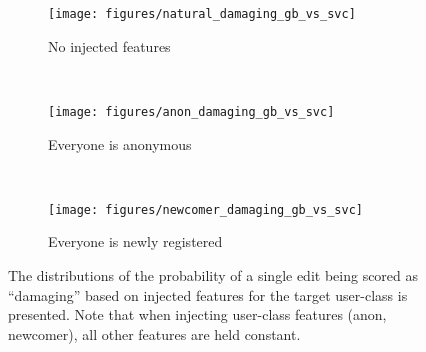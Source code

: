 \begin{figure*}[h!]
\centering
\begin{subfigure}[t]{.33\textwidth}
  \centering
  \texttt{[image: figures/natural\_damaging\_gb\_vs\_svc]}
  \caption{No injected features}
  \label{fig:natural_damaging_gb_bs_svc}
\end{subfigure}~~
\begin{subfigure}[t]{.33\textwidth}
  \centering
  \texttt{[image: figures/anon\_damaging\_gb\_vs\_svc]}
  \caption{Everyone is anonymous}
  \label{fig:anon_damaging_gb_bs_svc}
\end{subfigure}~~
\begin{subfigure}[t]{.33\textwidth}
  \centering
  \texttt{[image: figures/newcomer\_damaging\_gb\_vs\_svc]}
  \caption{Everyone is newly registered}
  \label{fig:newcomer_damaging_gb_bs_svc}
\end{subfigure}
\caption{The distributions of the probability of a single edit being scored as ``damaging'' based on injected features for the target user-class is presented.  Note that when injecting user-class features (anon, newcomer), all other features are held constant.}
\label{fig:prediction_error_for_anons_and_newcomers}
\end{figure*}
